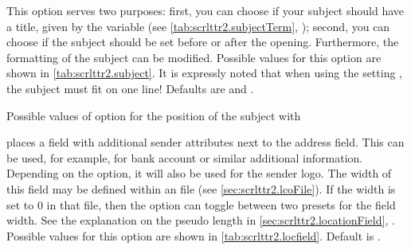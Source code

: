 \begin{Declaration}
\end{Declaration}
%
This option serves two purposes: first, you can choose if your
subject should have a title, given by the
 variable (see \autoref{tab:scrlttr2.subjectTerm},
); second, you can choose if the
subject should be set before or after the opening. Furthermore, the
formatting of the subject can be
modified. Possible values for this option are shown in
\autoref{tab:scrlttr2.subject}. It is expressly noted that when using
the setting , the subject must fit on one line!
Defaults are  and .
\begin{table}
  \caption[{Possible values of option  with
    }]{Possible values of option  for the
    position of the subject with
    }
  \label{tab:scrlttr2.subject}
  \begin{desctabular}
  \end{desctabular}
\end{table}
%
%

\begin{Declaration}
\end{Declaration}
%
 places a field with additional sender attributes next
to the address field. This can be used, for example, for bank account
or similar additional information.  Depending on the
 option, it will also be used for the sender
logo. The width of this field may be defined within an  file
(see \autoref{sec:scrlttr2.lcoFile}). If the width is set to 0 in that file,
then the  option can toggle between two presets for
the field width. See the explanation on the  pseudo
length in \autoref{sec:scrlttr2.locationField},
. Possible values for this
option are shown in \autoref{tab:scrlttr2.locfield}. Default is
.

